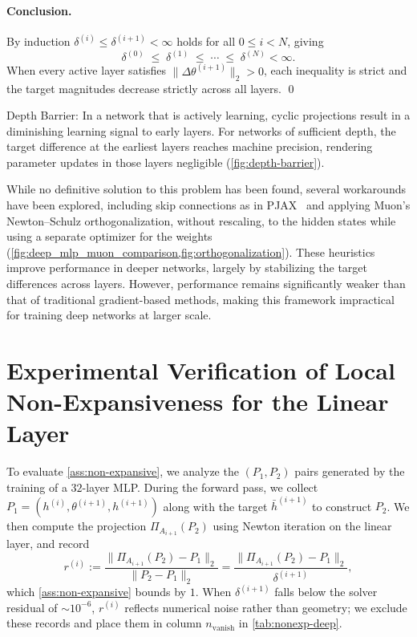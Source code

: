 \paragraph{Conclusion.}
By induction $\delta^{(i)} \leq \delta^{(i+1)} < \infty$ holds for all $0 \leq i < N$, giving
\[
\delta^{(0)} \;\leq\; \delta^{(1)} \;\leq\; \cdots \;\leq\; \delta^{(N)} < \infty .
\]
When every active layer satisfies $\|\Delta \theta^{(i+1)}\|_2 > 0$, each
inequality is strict and the target magnitudes decrease strictly across all
layers. \qed
\vspace{0.5em}
\begin{tcolorbox}
Depth Barrier: In a network that is actively learning, cyclic projections result in a diminishing learning signal to early layers. For networks of sufficient depth, the target difference at the earliest layers reaches machine precision, rendering parameter updates in those layers negligible (\cref{fig:depth-barrier}).
\end{tcolorbox}
\vspace{0.5em}

While no definitive solution to this problem has been found, several workarounds have been explored, including skip connections as in PJAX~\cite{bergmeister2025projection} and applying Muon's \cite{jordan2024muon} Newton--Schulz orthogonalization, without rescaling, to the hidden states while using a separate optimizer for the weights (\cref{fig:deep_mlp_muon_comparison,fig:orthogonalization}). These heuristics improve performance in deeper networks, largely by stabilizing the target differences across layers. However, performance remains significantly weaker than that of traditional gradient-based methods, making this framework impractical for training deep networks at larger scale.

\section{Experimental Verification of Local Non-Expansiveness for the Linear Layer}
\label{sec:Non-Expansiveness}
To evaluate \cref{ass:non-expansive}, we analyze the $(P_1, P_2)$ pairs generated by the training of a $32$-layer MLP. During the forward pass, we collect $P_1 = (h^{(i)}, \theta^{(i+1)}, h^{(i+1)})$ along with the target $\bar h^{(i+1)}$ to construct $P_2$. We then compute the projection $\Pi_{A_{i+1}}(P_2)$ using Newton iteration on the linear layer, and record
\[
  r^{(i)} := \frac{\|\Pi_{A_{i+1}}(P_2) - P_1\|_2}{\|P_2 - P_1\|_2} = \frac{\|\Pi_{A_{i+1}}(P_2) - P_1\|_2}{\delta^{(i+1)}},
\]
which \cref{ass:non-expansive} bounds by $1$. When $\delta^{(i+1)}$ falls below the solver residual of $\sim\!10^{-6}$, $r^{(i)}$ reflects numerical noise rather than geometry; we exclude these records and place them in column $n_{\mathrm{vanish}}$ in \cref{tab:nonexp-deep}.

